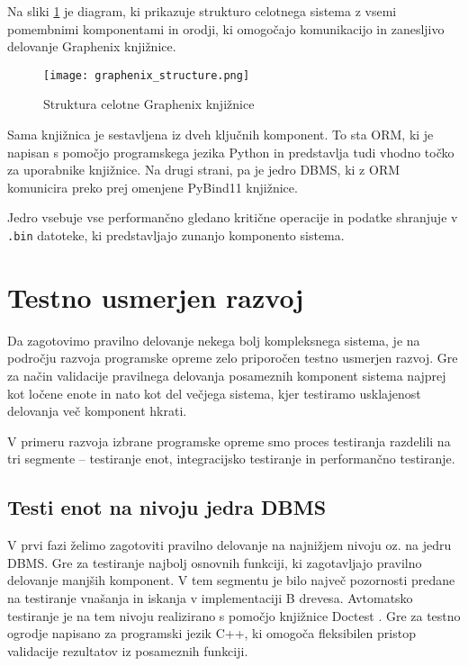 \documentclass[a4paper,12pt,openright]{book}
\begin{document}
    Na sliki \ref{graphenix_structure} je diagram, ki prikazuje strukturo celotnega sistema z vsemi pomembnimi komponentami in orodji, ki omogočajo komunikacijo in zanesljivo delovanje Graphenix knjižnice.
    
    \begin{figure}[H]
            \centerline{\texttt{[image: graphenix\_structure.png]}}
            \caption{Struktura celotne Graphenix knjižnice}
        \label{graphenix_structure}
    \end{figure}

    \noindent
    Sama knjižnica je sestavljena iz dveh ključnih komponent. To sta ORM, ki je napisan s pomočjo programskega jezika Python in predstavlja tudi vhodno točko za uporabnike knjižnice. Na drugi strani, pa je jedro DBMS, ki z ORM komunicira preko prej omenjene PyBind11 knjižnice.

    Jedro vsebuje vse performančno gledano kritične operacije in podatke shranjuje v {\tt .bin} datoteke, ki predstavljajo zunanjo komponento sistema.
    
    \section{Testno usmerjen razvoj}

    Da zagotovimo pravilno delovanje nekega bolj kompleksnega sistema, je na področju razvoja programske opreme zelo priporočen testno usmerjen razvoj. Gre za način validacije pravilnega delovanja posameznih komponent sistema najprej kot ločene enote in nato kot del večjega sistema, kjer testiramo usklajenost delovanja več komponent hkrati.
    
    V primeru razvoja izbrane programske opreme smo proces testiranja razdelili na tri segmente – testiranje enot, integracijsko testiranje in performančno testiranje.
   
   \subsection{Testi enot na nivoju jedra DBMS}

    V prvi fazi želimo zagotoviti pravilno delovanje na najnižjem nivoju oz. na jedru DBMS. Gre za testiranje najbolj osnovnih funkciji, ki zagotavljajo pravilno delovanje manjših komponent. V tem segmentu je bilo največ pozornosti predane na testiranje vnašanja in iskanja v implementaciji B drevesa. Avtomatsko testiranje je na tem nivoju realizirano s pomočjo knjižnice Doctest \cite{DOCTEST_GITHUB}. Gre za testno ogrodje napisano za programski jezik C++, ki omogoča fleksibilen pristop validacije rezultatov iz posameznih funkciji.
   
\end{document}
